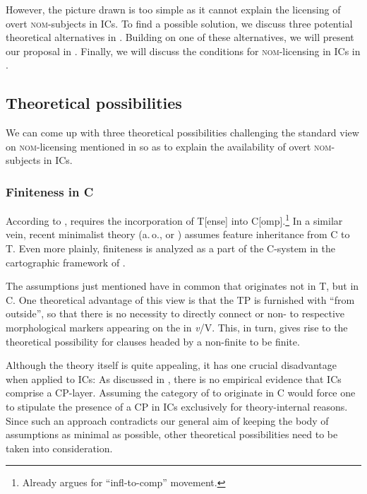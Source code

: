 \documentclass[output=paper,colorlinks,citecolor=brown,newtxmath]{langsci/langscibook}
\begin{document}
\noindent However, the picture drawn is too simple as it cannot explain the licensing of overt \textsc{nom}-subjects in  ICs. To find a possible solution, we discuss three potential theoretical alternatives in . Building on one of these alternatives, we will present our proposal in . Finally, we will discuss the conditions for \textsc{nom}-licensing in  ICs in .


\subsection{Theoretical possibilities}\label{sec:nom_possibilities}

We can come up with three theoretical possibilities challenging the standard view on \textsc{nom}-licensing mentioned in  so as to explain the availability of overt \textsc{nom}-subjects in ICs.

\subsubsection{Finiteness in C}\label{sec:nom_possibilities_1}

According to \citet{kayne1994},  requires the incorporation of T[ense] into C[omp].\footnote{Already \citet{Raposo1987} argues for ``infl-to-comp'' movement.} In a similar vein, recent minimalist theory (a.\,o., \citealt{Chomsky2007} or \citealt{Richards2007}) assumes feature inheritance from C to T. Even more plainly, finite\-ness is analyzed as a part of the C-system in the cartographic framework of \citet{rizzi1997}.

The assumptions just mentioned have in common that  originates not in T, but in C. One theoretical advantage of this view is that the TP is furnished with  ``from outside'', so that there is no necessity to directly connect  or non- to respective morphological markers appearing on the  in \textit{v}/V. This, in turn, gives rise to the theoretical possibility for clauses headed by a non-finite  to be finite.

Although the theory itself is quite appealing, it has one crucial disadvantage when applied to ICs: As discussed in , there is no empirical evidence that ICs comprise a CP-layer. Assuming the category of  to originate in C would force one to stipulate the presence of a CP in ICs exclusively for theory-internal reasons. Since such an approach contradicts our general aim of keeping the body of assumptions as minimal as possible, other theoretical possibilities need to be taken into consideration.
\end{document}
